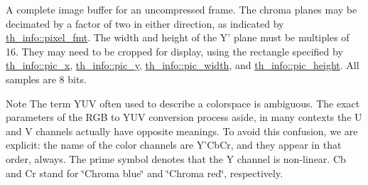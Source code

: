 A complete image buffer for an uncompressed frame. The chroma planes may be decimated by a factor of two in either direction, as indicated by \hyperlink{structth__info_a2301388ef3755c41ab12fd144c1fc54e}{th\+\_\+info\+::pixel\+\_\+fmt}. The width and height of the Y' plane must be multiples of 16. They may need to be cropped for display, using the rectangle specified by \hyperlink{structth__info_a5b3f834bcf141564e7bb14f49101870f}{th\+\_\+info\+::pic\+\_\+x}, \hyperlink{structth__info_a8aacc575cab2dfe3735001c2ad32aa14}{th\+\_\+info\+::pic\+\_\+y}, \hyperlink{structth__info_a5048edf77b141dd3e9a92ca85e317345}{th\+\_\+info\+::pic\+\_\+width}, and \hyperlink{structth__info_a775178474283c5990ba73f9ba7f6b88b}{th\+\_\+info\+::pic\+\_\+height}. All samples are 8 bits. \begin{DoxyNote}{Note}
The term Y\+U\+V often used to describe a colorspace is ambiguous. The exact parameters of the R\+G\+B to Y\+U\+V conversion process aside, in many contexts the U and V channels actually have opposite meanings. To avoid this confusion, we are explicit\+: the name of the color channels are Y'Cb\+Cr, and they appear in that order, always. The prime symbol denotes that the Y channel is non-\/linear. Cb and Cr stand for \char`\"{}\+Chroma blue\char`\"{} and \char`\"{}\+Chroma red\char`\"{}, respectively. 
\end{DoxyNote}


